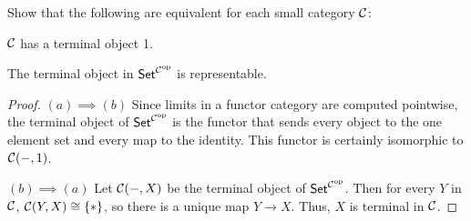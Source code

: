 \begin{exercise}{56}
    Show that the following are equivalent for each small category $\mathcal{C}$:
    \begin{equivalent}
        \item $\mathcal{C}$ has a terminal object 1.
        \item The terminal object in ${\normalfont\mathsf{Set}}^{{\mathcal{C}}^{\text{op}}}$ is representable.
    \end{equivalent}
\end{exercise}
\begin{solution}
    \begin{proof}
        $(a)\implies (b)$ Since limits in a functor category are computed pointwise, the terminal object of ${\normalfont\mathsf{Set}}^{{\mathcal{C}}^{\text{op}}}$ is the functor that sends every object to the one element set and every map to the identity.
        This functor is certainly isomorphic to $\mathcal{C}(-,1)$.

        $(b)\implies (a)$ Let $\mathcal{C}(-,X)$ be the terminal object of ${\normalfont\mathsf{Set}}^{{\mathcal{C}}^{\text{op}}}$. Then for every $Y$ in $\mathcal{C}$, $\mathcal{C}(Y,X)\cong\{*\}$, so there is a unique map $Y\to X$.
        Thus, $X$ is terminal in $\mathcal{C}$.
    \end{proof}
\end{solution}

